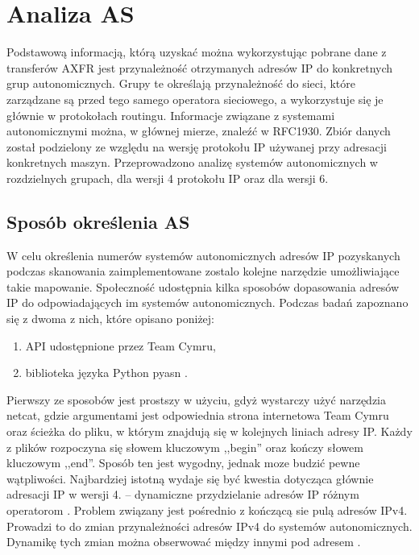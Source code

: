\section{Analiza AS}
Podstawową informacją, którą uzyskać można wykorzystując pobrane dane z transferów AXFR jest przynależność otrzymanych adresów IP do konkretnych grup autonomicznych. Grupy te określają przynależność do sieci, które zarządzane są przed tego samego operatora sieciowego, a wykorzystuje się je głównie w protokołach routingu. Informacje związane z systemami autonomicznymi można, w głównej mierze, znaleźć w RFC1930\cite{RFC1930}. Zbiór danych został podzielony ze względu na wersję protokołu IP używanej przy adresacji konkretnych maszyn. Przeprowadzono analizę systemów autonomicznych w rozdzielnych grupach, dla wersji 4 protokołu IP oraz dla wersji 6.

\subsection{Sposób określenia AS}
W celu określenia numerów systemów autonomicznych adresów IP pozyskanych podczas skanowania zaimplementowane zostalo kolejne narzędzie umożliwiające takie mapowanie. Społeczność udostępnia kilka sposobów dopasowania adresów IP do odpowiadających im systemów autonomicznych. Podczas badań zapoznano się z dwoma z nich, które opisano poniżej:
\begin{enumerate}
	\item API udostępnione przez Team Cymru\cite{cymru},
	\item biblioteka języka Python pyasn \cite{pyasn}.
\end{enumerate}

Pierwszy ze sposobów jest prostszy w użyciu, gdyż wystarczy użyć narzędzia netcat\cite{netcat}, gdzie argumentami jest odpowiednia strona internetowa Team Cymru\cite{cymru} oraz ścieżka do pliku, w którym znajdują się w kolejnych liniach adresy IP. Każdy z plików rozpoczyna się słowem kluczowym ,,begin'' oraz kończy słowem kluczowym ,,end''. Sposób ten jest wygodny, jednak moze budzić pewne wątpliwości. Najbardziej istotną wydaje się być kwestia dotycząca głównie adresacji IP w wersji 4. -- dynamiczne przydzielanie adresów IP różnym operatorom \cite{}. Problem związany jest pośrednio z kończącą sie pulą adresów IPv4. Prowadzi to do zmian przynależności adresów IPv4 do systemów autonomicznych. Dynamikę tych zmian można obserwować między innymi pod adresem \cite{}. 

